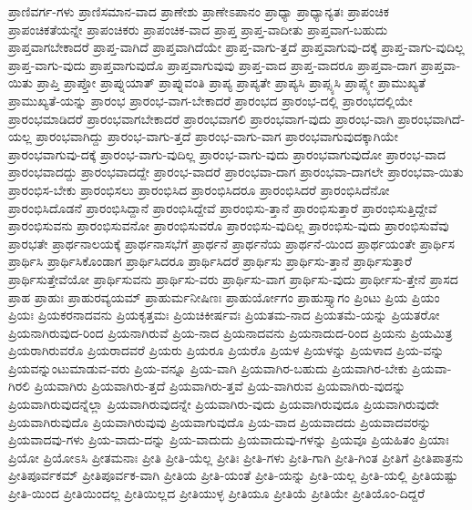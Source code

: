 {ಪ್ರಾಣಿವರ್ಗ-ಗಳು
ಪ್ರಾಣಿಸಮಾನ-ವಾದ
ಪ್ರಾಣೇಶು
ಪ್ರಾಣೇಽಪಾನಂ
ಪ್ರಾಧ್ಯಾ
ಪ್ರಾಧ್ಯಾನ್ಯತಃ
ಪ್ರಾಪಂಚಿಕ
ಪ್ರಾಪಂಚಿಕತೆಯನ್ನೇ
ಪ್ರಾಪಂಚಿಕರು
ಪ್ರಾಪಂಚಿಕ-ವಾದ
ಪ್ರಾಪ್ತ
ಪ್ರಾಪ್ತ-ವಾದೀತು
ಪ್ರಾಪ್ತವಾಗ-ಬಹುದು
ಪ್ರಾಪ್ತವಾಗಬೇಕಾದರೆ
ಪ್ರಾಪ್ತ-ವಾಗಿದೆ
ಪ್ರಾಪ್ತವಾಗಿದೆಯೇ
ಪ್ರಾಪ್ತ-ವಾಗು-ತ್ತದೆ
ಪ್ರಾಪ್ತವಾಗುವು-ದಕ್ಕೆ
ಪ್ರಾಪ್ತ-ವಾಗು-ವುದಿಲ್ಲ
ಪ್ರಾಪ್ತ-ವಾಗು-ವುದು
ಪ್ರಾಪ್ತವಾಗುವುದೊ
ಪ್ರಾಪ್ತವಾಗುವುವು
ಪ್ರಾಪ್ತ-ವಾದ
ಪ್ರಾಪ್ತ-ವಾದರೂ
ಪ್ರಾಪ್ತವಾ-ದಾಗ
ಪ್ರಾಪ್ತವಾ-ಯಿತು
ಪ್ರಾಪ್ತಿ
ಪ್ರಾಪ್ತೋ
ಪ್ರಾಪ್ನುಯಾತ್
ಪ್ರಾಪ್ನುವಂತಿ
ಪ್ರಾಪ್ಯ
ಪ್ರಾಪ್ಯತೇ
ಪ್ರಾಪ್ಯಸಿ
ಪ್ರಾಪ್ಸ್ಯಸಿ
ಪ್ರಾಪ್ಸ್ಯೇ
ಪ್ರಾಮುಖ್ಯತೆ
ಪ್ರಾಮುಖ್ಯತೆ-ಯನ್ನು
ಪ್ರಾರಂಭ
ಪ್ರಾರಂಭ-ವಾಗ-ಬೇಕಾದರೆ
ಪ್ರಾರಂಭದ
ಪ್ರಾರಂಭ-ದಲ್ಲಿ
ಪ್ರಾರಂಭದಲ್ಲಿಯೇ
ಪ್ರಾರಂಭಮಾಡಿದರೆ
ಪ್ರಾರಂಭವಾಗಬೇಕಾದರೆ
ಪ್ರಾರಂಭವಾಗಲಿ
ಪ್ರಾರಂಭವಾಗ-ವುದು
ಪ್ರಾರಂಭ-ವಾಗಿ
ಪ್ರಾರಂಭವಾಗಿದೆ-ಯಲ್ಲ
ಪ್ರಾರಂಭವಾಗಿದ್ದು
ಪ್ರಾರಂಭ-ವಾಗು-ತ್ತದೆ
ಪ್ರಾರಂಭ-ವಾಗು-ವಾಗ
ಪ್ರಾರಂಭವಾಗುವುದಕ್ಕಾಗಿಯೇ
ಪ್ರಾರಂಭವಾಗುವು-ದಕ್ಕೆ
ಪ್ರಾರಂಭ-ವಾಗು-ವುದಿಲ್ಲ
ಪ್ರಾರಂಭ-ವಾಗು-ವುದು
ಪ್ರಾರಂಭವಾಗುವುದೋ
ಪ್ರಾರಂಭ-ವಾದ
ಪ್ರಾರಂಭವಾದದ್ದು
ಪ್ರಾರಂಭವಾದದ್ದೇ
ಪ್ರಾರಂಭ-ವಾದರೆ
ಪ್ರಾರಂಭವಾ-ದಾಗ
ಪ್ರಾರಂಭವಾ-ದಾಗಲೇ
ಪ್ರಾರಂಭವಾ-ಯಿತು
ಪ್ರಾರಂಭಿಸ-ಬೇಕು
ಪ್ರಾರಂಭಿಸಲು
ಪ್ರಾರಂಭಿಸಿದ
ಪ್ರಾರಂಭಿಸಿದರೂ
ಪ್ರಾರಂಭಿಸಿದರೆ
ಪ್ರಾರಂಭಿಸಿದೆನೋ
ಪ್ರಾರಂಭಿಸಿದೊಡನೆ
ಪ್ರಾರಂಭಿಸಿದ್ದಾನೆ
ಪ್ರಾರಂಭಿಸಿದ್ದೇವೆ
ಪ್ರಾರಂಭಿಸು-ತ್ತಾನೆ
ಪ್ರಾರಂಭಿಸುತ್ತಾರೆ
ಪ್ರಾರಂಭಿಸುತ್ತಿದ್ದೇವೆ
ಪ್ರಾರಂಭಿಸುವನು
ಪ್ರಾರಂಭಿಸುವನೋ
ಪ್ರಾರಂಭಿಸುವರೊ
ಪ್ರಾರಂಭಿಸು-ವುದಿಲ್ಲ
ಪ್ರಾರಂಭಿಸು-ವುದು
ಪ್ರಾರಂಭಿಸುವೆವು
ಪ್ರಾರಭತೇ
ಪ್ರಾರ್ಥನಾಲಯಕ್ಕೆ
ಪ್ರಾರ್ಥನಾಸಭೆಗೆ
ಪ್ರಾರ್ಥನೆ
ಪ್ರಾರ್ಥನೆಯ
ಪ್ರಾರ್ಥನೆ-ಯಿಂದ
ಪ್ರಾರ್ಥಯಂತೇ
ಪ್ರಾರ್ಥಿಸ
ಪ್ರಾರ್ಥಿಸಿ
ಪ್ರಾರ್ಥಿಸಿಕೊಂಡಾಗ
ಪ್ರಾರ್ಥಿಸಿದರೂ
ಪ್ರಾರ್ಥಿಸಿದರೆ
ಪ್ರಾರ್ಥಿಸು
ಪ್ರಾರ್ಥಿಸು-ತ್ತಾನೆ
ಪ್ರಾರ್ಥಿಸುತ್ತಾರೆ
ಪ್ರಾರ್ಥಿಸುತ್ತೇವೆಯೋ
ಪ್ರಾರ್ಥಿಸುವನು
ಪ್ರಾರ್ಥಿಸು-ವರು
ಪ್ರಾರ್ಥಿಸು-ವಾಗ
ಪ್ರಾರ್ಥಿಸು-ವುದು
ಪ್ರಾರ್ಥೀಸು-ತ್ತೇನೆ
ಪ್ರಾಸದ
ಪ್ರಾಹ
ಪ್ರಾಹುಃ
ಪ್ರಾಹುರವ್ಯಯಮ್
ಪ್ರಾಹುರ್ಮನೀಷಿಣಃ
ಪ್ರಾಹುರ್ಯೋಗಂ
ಪ್ರಾಹುಸ್ತ್ಯಾಗಂ
ಪ್ರಿಂಟು
ಪ್ರಿಯ
ಪ್ರಿಯಂ
ಪ್ರಿಯಃ
ಪ್ರಿಯಕರನಾದವನು
ಪ್ರಿಯಕೃತ್ತಮಃ
ಪ್ರಿಯಚಿಕೀರ್ಷವಃ
ಪ್ರಿಯತಮ-ನಾದ
ಪ್ರಿಯತಮೆ-ಯನ್ನು
ಪ್ರಿಯತರೋ
ಪ್ರಿಯನಾಗಿರುವುದ-ರಿಂದ
ಪ್ರಿಯನಾಗಿರುವೆ
ಪ್ರಿಯ-ನಾದ
ಪ್ರಿಯನಾದವನು
ಪ್ರಿಯನಾದುದ-ರಿಂದ
ಪ್ರಿಯನು
ಪ್ರಿಯಮಿತ್ರ
ಪ್ರಿಯರಾಗಿರುವರೊ
ಪ್ರಿಯರಾದವರೆ
ಪ್ರಿಯರು
ಪ್ರಿಯರೂ
ಪ್ರಿಯರೊ
ಪ್ರಿಯಳ
ಪ್ರಿಯಳನ್ನು
ಪ್ರಿಯಳಾದ
ಪ್ರಿಯ-ವನ್ನು
ಪ್ರಿಯವನ್ನುಂಟುಮಾಡುವ-ವರು
ಪ್ರಿಯ-ವನ್ನೂ
ಪ್ರಿಯ-ವಾಗಿ
ಪ್ರಿಯವಾಗಿರ-ಬಹುದು
ಪ್ರಿಯವಾಗಿರ-ಬೇಕು
ಪ್ರಿಯವಾ-ಗಿರಲಿ
ಪ್ರಿಯವಾಗಿರು
ಪ್ರಿಯವಾಗಿರು-ತ್ತದೆ
ಪ್ರಿಯವಾಗಿರು-ತ್ತವೆ
ಪ್ರಿಯ-ವಾಗಿರುವ
ಪ್ರಿಯವಾಗಿರು-ವುದನ್ನು
ಪ್ರಿಯವಾಗಿರುವುದನ್ನೆಲ್ಲಾ
ಪ್ರಿಯವಾಗಿರುವುದನ್ನೇ
ಪ್ರಿಯವಾಗಿರು-ವುದು
ಪ್ರಿಯವಾಗಿರುವುದೂ
ಪ್ರಿಯವಾಗಿರುವುದೇ
ಪ್ರಿಯವಾಗಿರುವುದೊ
ಪ್ರಿಯವಾಗಿರುವುವು
ಪ್ರಿಯವಾಗುವುದೊ
ಪ್ರಿಯ-ವಾದ
ಪ್ರಿಯವಾದದು
ಪ್ರಿಯವಾದವರನ್ನು
ಪ್ರಿಯವಾದವು-ಗಳು
ಪ್ರಿಯ-ವಾದು-ದನ್ನು
ಪ್ರಿಯ-ವಾದುದು
ಪ್ರಿಯವಾದುವು-ಗಳನ್ನು
ಪ್ರಿಯವೂ
ಪ್ರಿಯಹಿತಂ
ಪ್ರಿಯಾಃ
ಪ್ರಿಯೋ
ಪ್ರಿಯೋಽಸಿ
ಪ್ರೀತಮನಾಃ
ಪ್ರೀತಿ
ಪ್ರೀತಿ-ಯೆಲ್ಲ
ಪ್ರೀತಿಃ
ಪ್ರೀತಿ-ಗಳು
ಪ್ರೀತಿ-ಗಾಗಿ
ಪ್ರೀತಿ-ಗಿಂತ
ಪ್ರೀತಿಗೆ
ಪ್ರೀತಿಪಾತ್ರನು
ಪ್ರೀತಿಪೂರ್ವಕಮ್
ಪ್ರೀತಿಪೂರ್ವಕ-ವಾಗಿ
ಪ್ರೀತಿಯ
ಪ್ರೀತಿ-ಯಂತೆ
ಪ್ರೀತಿ-ಯನ್ನು
ಪ್ರೀತಿ-ಯಲ್ಲ
ಪ್ರೀತಿ-ಯಲ್ಲಿ
ಪ್ರೀತಿಯಷ್ಟು
ಪ್ರೀತಿ-ಯಿಂದ
ಪ್ರೀತಿಯಿಂದಲ್ಲ
ಪ್ರೀತಿಯಿಲ್ಲದ
ಪ್ರೀತಿಯುಳ್ಳ
ಪ್ರೀತಿಯೂ
ಪ್ರೀತಿಯೆ
ಪ್ರೀತಿಯೇ
ಪ್ರೀತಿಯೊಂ-ದಿದ್ದರೆ
}
